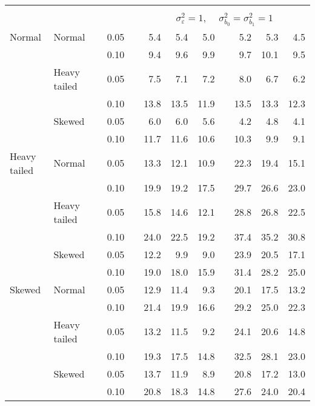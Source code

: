 \begin{table}[ht]
\begin{scriptsize}
\begin{center}
\begin{tabular}{ll p{.1cm} c p{.1cm} rrr p{.1cm} rrr}
&&&&&&&&&&&\\
& && && \multicolumn{7}{c}{$\sigma_{\varepsilon}^2 = 1$, \ \ $\sigma_{b_0}^2 = \sigma_{b_1}^2 = 1$} \\ \cline{6-12}
Normal       & Normal       && 0.05 &&   5.4 & 5.4 & 5.0 &   & 5.2 & 5.3 & 4.5 \\ 
             &              && 0.10 &&   9.4 & 9.6 & 9.9 &   & 9.7 & 10.1 & 9.5 \\ 
             & Heavy tailed && 0.05 &&   7.5 & 7.1 & 7.2 &   & 8.0 & 6.7 & 6.2 \\ 
             &              && 0.10 &&   13.8 & 13.5 & 11.9 &   & 13.5 & 13.3 & 12.3 \\ 
             & Skewed       && 0.05 &&   6.0 & 6.0 & 5.6 &   & 4.2 & 4.8 & 4.1 \\ 
             &              && 0.10 &&   11.7 & 11.6 & 10.6 &   & 10.3 & 9.9 & 9.1 \\ 
Heavy tailed & Normal       && 0.05 &&   13.3 & 12.1 & 10.9 &   & 22.3 & 19.4 & 15.1 \\ 
             &              && 0.10 &&   19.9 & 19.2 & 17.5 &   & 29.7 & 26.6 & 23.0 \\ 
             & Heavy tailed && 0.05 &&   15.8 & 14.6 & 12.1 &   & 28.8 & 26.8 & 22.5 \\ 
             &              && 0.10 &&   24.0 & 22.5 & 19.2 &   & 37.4 & 35.2 & 30.8 \\ 
             & Skewed       && 0.05 &&   12.2 & 9.9 & 9.0 &   & 23.9 & 20.5 & 17.1 \\ 
             &              && 0.10 &&   19.0 & 18.0 & 15.9 &   & 31.4 & 28.2 & 25.0 \\ 
Skewed       & Normal       && 0.05 &&   12.9 & 11.4 & 9.3 &   & 20.1 & 17.5 & 13.2 \\ 
             &              && 0.10 &&   21.4 & 19.9 & 16.6 &   & 29.2 & 25.0 & 22.3 \\ 
             & Heavy tailed && 0.05 &&   13.2 & 11.5 & 9.2 &   & 24.1 & 20.6 & 14.8 \\ 
             &              && 0.10 &&   19.3 & 17.5 & 14.8 &   & 32.5 & 28.1 & 23.0 \\ 
             & Skewed       && 0.05 &&   13.7 & 11.9 & 8.9 &   & 20.8 & 17.2 & 13.0 \\ 
             &              && 0.10 &&   20.8 & 18.3 & 14.8 &   & 27.6 & 24.0 & 20.4 \\ 


\end{tabular}
\end{center}
\end{scriptsize}
\end{table}

